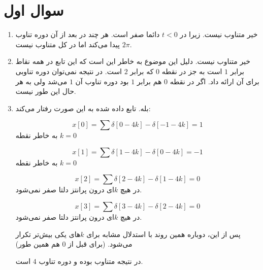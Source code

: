 \documentclass[12pt]{article}
\begin{document}
\KashidaOff

\section{سوال اول}

\begin{enumerate}[label = \Alph*)]
	
	\item
	
	خیر متناوب نیست. زیرا در $t<0$ دائما صفر است. هر چند در بعد از آن دوره تناوب $2\pi$ پیدا‌ می‌کند اما در کل متناوب نیست.
	
	\item
	
	خیر متناوب نیست. دلیل این موضوع به خاطر این است که این تابع در همه نقاط برابر $1$ است به جز در نقطه $0$ که برابر $2$ است. در نتیجه نمی‌توان دوره تناوبی برای آن ارائه داد. اگر در نقطه $0$ هم برابر $1$ بود دوره تناوب آن $1$ می‌شد ولی به هر حال این طور نیست.
	
	\item
	
	بله. تابع داده شده به این صورت رفتار می‌کند:
	
	$$x[0] =  \sum \delta[0-4k] - \delta[-1 - 4k] = 1$$
	به خاطر نقطه $k=0$
	
	$$x[1] = \sum \delta[1 - 4k] - \delta[0 - 4k] = -1$$
	به خاطر نقطه $k=0$
	
	$$x[2] =  \sum \delta[2-4k] - \delta[1 - 4k] = 0$$
	در هیچ $k$ای درون پرانتز دلتا صفر نمی‌شود.
	
	$$x[3] =  \sum \delta[3-4k] - \delta[2 - 4k] = 0$$
	در هیچ $k$ای درون پرانتز دلتا صفر نمی‌شود.
	
	پس از این، دوباره همین روند با استدلال مشابه برای $k$‌های یکی بیش‌تر تکرار می‌شود. (برای قبل از $0$ هم همین طور)
	
	در نتیجه متناوب بوده و دوره تناوب $4$ است. 
	
	\begin{center}
	\end{center}
	
\end{enumerate}
\end{document}
